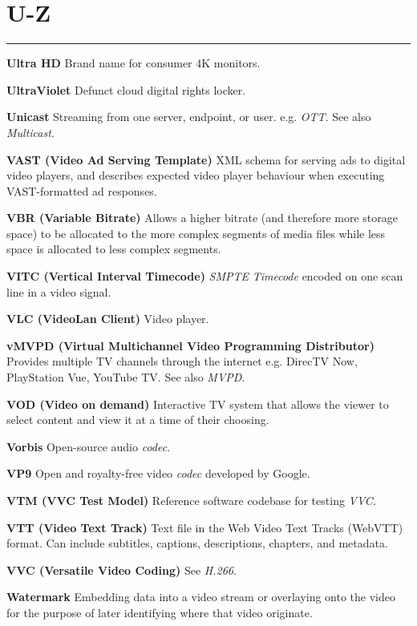 \section{U-Z}
\hrule

\medskip
\textbf{Ultra HD}
Brand name for consumer 4K monitors.

\smallskip
\textbf{UltraViolet}
Defunct cloud digital rights locker.

\smallskip
\textbf{Unicast}
Streaming from one server, endpoint, or user. e.g. \textit{OTT}.  See also \textit{Multicast}.

\smallskip
\textbf{VAST (Video Ad Serving Template)}
XML schema for serving ads to digital video players, and describes expected video player behaviour when executing VAST-formatted ad responses.

\smallskip
\textbf{VBR (Variable Bitrate)}
Allows a higher bitrate (and therefore more storage space) to be allocated to the more complex segments of media files while less space is allocated to less complex segments.

\smallskip
\textbf{VITC (Vertical Interval Timecode)}
\textit{SMPTE} \textit{Timecode} encoded on one scan line in a video signal.

\smallskip
\textbf{VLC (VideoLan Client)}
Video player.

\smallskip
\textbf{vMVPD (Virtual Multichannel Video Programming Distributor)}
Provides multiple TV channels through the internet e.g. DirecTV Now, PlayStation Vue, YouTube TV. See also \textit{MVPD}.

\smallskip
\textbf{VOD (Video on demand)}
Interactive TV system that allows the viewer to select content and view it at a time of their choosing.

\smallskip
\textbf{Vorbis}
Open-source audio \textit{codec}.

\smallskip
\textbf{VP9}
Open and royalty-free video \textit{codec} developed by Google.

\smallskip
\textbf{VTM (VVC Test Model)}
Reference software codebase for testing \textit{VVC}.

\smallskip
\textbf{VTT (Video Text Track)}
Text file in the Web Video Text Tracks (WebVTT) format. Can include subtitles, captions, descriptions, chapters, and metadata.

\smallskip
\textbf{VVC (Versatile Video Coding)}
See \textit{H.266}.

\smallskip
\textbf{Watermark}
Embedding data into a video stream or overlaying onto the video for the purpose of later identifying where that video originate.


